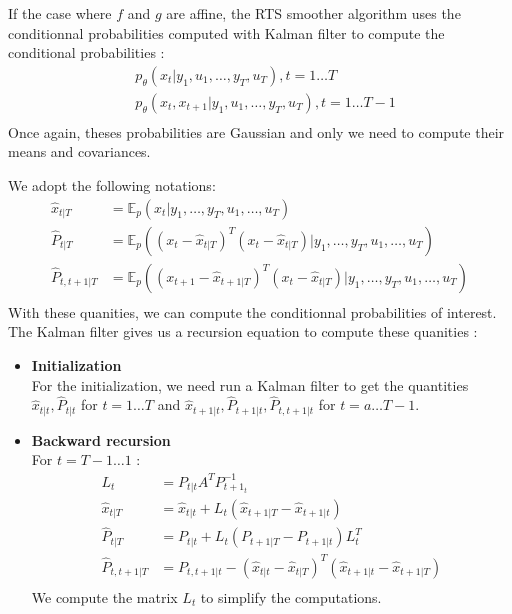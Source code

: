 If the case where $f$ and $g$ are affine, the RTS smoother algorithm uses the conditionnal probabilities computed with Kalman filter to compute the conditional probabilities :
\begin{align*}
  &p_{\theta}\left(x_t|y_1, u_1, \ldots, y_T, u_T \right ), t=1 \ldots T\\
  &p_{\theta}\left(x_t, x_{t+1}|y_1, u_1, \ldots, y_T, u_T \right ), t=1 \ldots T-1\\
\end{align*}
Once again, theses probabilities are Gaussian and only we need to compute their means and covariances.

We adopt the following notations:
\begin{align*}
  \hat{x}_{t|T} &= \mathbb{E}_p(x_t|y_1, \ldots , y_T, u_1, \ldots , u_T) \\
  \hat{P}_{t|T} &= \mathbb{E}_p \left ((x_t - \hat{x}_{t|T})^T(x_t - \hat{x}_{t|T})|y_1, \ldots , y_T, u_1, \ldots , u_T \right ) \\
  \hat{P}_{t,t+1|T} &= \mathbb{E}_p \left ((x_{t+1} - \hat{x}_{t+1|T})^T(x_t - \hat{x}_{t|T})|y_1, \ldots , y_T, u_1, \ldots , u_T \right ) \\
\end{align*}
With these quanities, we can compute the conditionnal probabilities of interest.
The Kalman filter gives us a recursion equation to compute these quanities :
\begin{itemize}
  \item \textbf{Initialization}\\
    For the initialization, we need run a Kalman filter to get the quantities $\hat{x}_{t|t}, \hat{P}_{t|t}$ for $t=1 \ldots T$ and $\hat{x}_{t+1|t}, \hat{P}_{t+1|t}, \hat{P}_{t,t+1|t}$ for $t=a \ldots T-1$.
  \item \textbf{Backward recursion}\\
    For $t=T-1 \ldots 1$ :
    \begin{align*}
      L_t &= P_{t|t}A^TP_{t+1_t}^{-1}\\
      \hat{x}_{t|T} &= \hat{x}_{t|t} + L_t(\hat{x}_{t+1|T} - \hat{x}_{t+1|t})\\
      \hat{P}_{t|T} &= P_{t|t} + L_t(P_{t+1|T} - P_{t+1|t})L_t^T\\
      \hat{P}_{t,t+1|T} &= P_{t,t+1|t} - (\hat{x}_{t|t} - \hat{x}_{t|T})^T(\hat{x}_{t+1|t} - \hat{x}_{t+1|T})\\
    \end{align*}
    We compute the matrix $L_{t}$ to simplify the computations.
\end{itemize}

